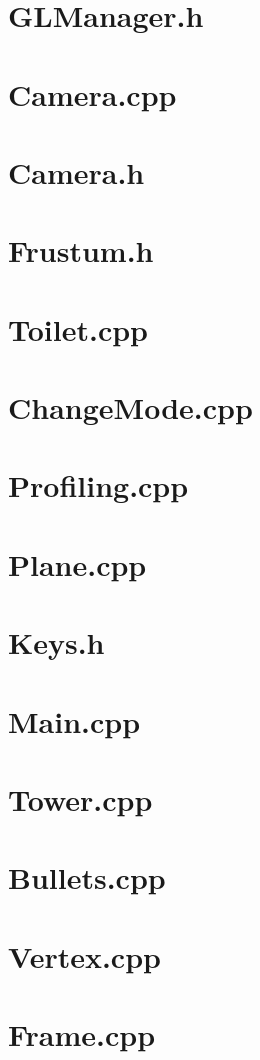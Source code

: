 \section*{GLManager.h}

\pagebreak
\section*{Camera.cpp}

\pagebreak
\section*{Camera.h}

\pagebreak
\section*{Frustum.h}

\pagebreak
\section*{Toilet.cpp}

\pagebreak
\section*{ChangeMode.cpp}

\pagebreak
\section*{Profiling.cpp}

\pagebreak
\section*{Plane.cpp}

\pagebreak
\section*{Keys.h}

\pagebreak
\section*{Main.cpp}

\pagebreak
\section*{Tower.cpp}

\pagebreak
\section*{Bullets.cpp}

\pagebreak
\section*{Vertex.cpp}

\pagebreak
\section*{Frame.cpp}

\pagebreak
